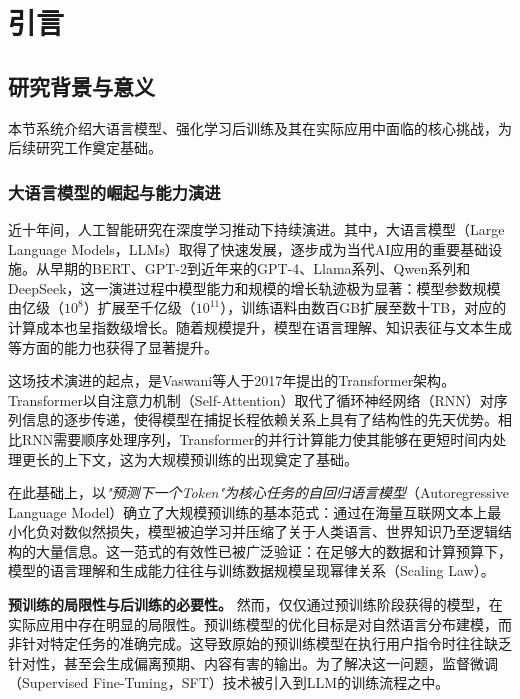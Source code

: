 \chapter{引言}
\label{chap:introduction}

\section{研究背景与意义}
\label{sec:background}

本节系统介绍大语言模型、强化学习后训练及其在实际应用中面临的核心挑战，为后续研究工作奠定基础。

\subsection{大语言模型的崛起与能力演进}
\label{subsec:llm_evolution}

近十年间，人工智能研究在深度学习推动下持续演进。其中，大语言模型（Large Language Models，LLMs）取得了快速发展，逐步成为当代AI应用的重要基础设施。从早期的BERT\cite{devlin2018bert}、GPT-2到近年来的GPT-4\cite{openai2023gpt4}、Llama系列\cite{touvron2023llama}、Qwen系列和DeepSeek，这一演进过程中模型能力和规模的增长轨迹极为显著：模型参数规模由亿级（$10^8$）扩展至千亿级（$10^{11}$），训练语料由数百GB扩展至数十TB，对应的计算成本也呈指数级增长。随着规模提升，模型在语言理解、知识表征与文本生成等方面的能力也获得了显著提升。

这场技术演进的起点，是Vaswani等人于2017年提出的Transformer架构\cite{vaswani2017attention}。Transformer以自注意力机制（Self-Attention）取代了循环神经网络（RNN）对序列信息的逐步传递，使得模型在捕捉长程依赖关系上具有了结构性的先天优势。相比RNN需要顺序处理序列，Transformer的并行计算能力使其能够在更短时间内处理更长的上下文，这为大规模预训练的出现奠定了基础。

在此基础上，以\textit{"预测下一个Token"为核心任务的自回归语言模型}（Autoregressive Language Model）确立了大规模预训练的基本范式：通过在海量互联网文本上最小化负对数似然损失，模型被迫学习并压缩了关于人类语言、世界知识乃至逻辑结构的大量信息。这一范式的有效性已被广泛验证：在足够大的数据和计算预算下，模型的语言理解和生成能力往往与训练数据规模呈现幂律关系（Scaling Law）。

\textbf{预训练的局限性与后训练的必要性。} 然而，仅仅通过预训练阶段获得的模型，在实际应用中存在明显的局限性。预训练模型的优化目标是对自然语言分布建模，而非针对特定任务的准确完成。这导致原始的预训练模型在执行用户指令时往往缺乏针对性，甚至会生成偏离预期、内容有害的输出。为了解决这一问题，监督微调（Supervised Fine-Tuning，SFT）技术被引入到LLM的训练流程之中。

